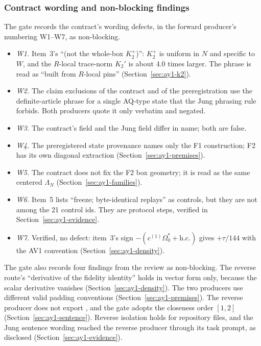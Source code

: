 \subsubsection{Contract wording and non-blocking findings}
\label{sec:ay1-findings}
The gate records the contract's wording defects, in the forward producer's
numbering W1--W7, as non-blocking.
\begin{itemize}
\item \emph{W1.} Item~3's ``(not the whole-box $K_2^+$)'': $K_2^+$ is uniform
 in $N$ and specific to $W$, and the $R$-local trace-norm $K_2'$ is about 4.0
 times larger. The phrase is read as ``built from $R$-local pins''
 (Section~\ref{sec:ay1-k2}).
\item \emph{W2.} The claim exclusions of the contract and of the
 preregistration use the definite-article phrase for a single AQ-type state
 that the Jung phrasing rule forbids. Both producers quote it only verbatim
 and negated.
\item \emph{W3.} The contract's field  and the Jung
 field  differ in name; both are false.
\item \emph{W4.} The preregistered state provenance names only the F1
 construction; F2 has its own diagonal extraction
 (Section~\ref{sec:ay1-premises}).
\item \emph{W5.} The contract does not fix the F2 box geometry; it is read as
 the same centered $\Lambda_N$ (Section~\ref{sec:ay1-families}).
\item \emph{W6.} Item~5 lists ``freeze; byte-identical replays'' as controls,
 but they are not among the 21 control ids. They are protocol steps, verified
 in Section~\ref{sec:ay1-evidence}.
\item \emph{W7.} Verified, no defect: item~3's sign
 $-(c^{(1)}\Omega_0^*+\text{h.c.})$ gives $+\tau/144$ with the AV1
 convention (Section~\ref{sec:ay1-density}).
\end{itemize}
The gate also records four findings from the review as non-blocking. The
reverse route's ``derivative of the fidelity identity'' holds in vector form
only, because the scalar derivative vanishes (Section~\ref{sec:ay1-density}).
The two producers use different valid padding conventions
(Section~\ref{sec:ay1-premises}). The reverse producer does not export
, and the gate adopts the closeness order $[1,2]$
(Section~\ref{sec:ay1-sentence}). Reverse isolation holds for repository
files, and the Jung sentence wording reached the reverse producer through its
task prompt, as disclosed (Section~\ref{sec:ay1-evidence}).

